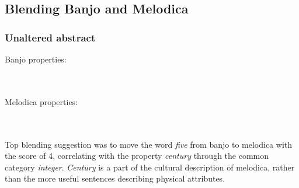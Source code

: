 \subsection{Blending Banjo and Melodica}

\subsubsection{Unaltered abstract}

Banjo properties:

\noindent{}
\\\\Melodica properties:

\noindent{}
\\\\Top blending suggestion was to move the word \emph{five} from banjo to melodica with the score of 4, correlating with the property \emph{century} through the common category \emph{integer}. \emph{Century} is a part of the cultural description of melodica, rather than the more useful sentences describing physical attributes.

